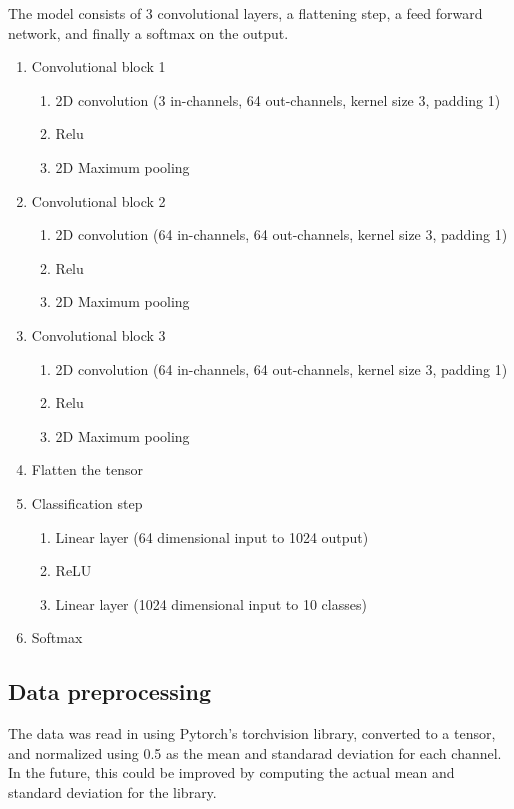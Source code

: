 \documentclass[letterpaper, 12pt]{article}
\begin{document}
The model consists of 3 convolutional layers, a flattening step, a feed forward network, and finally a softmax on the output.
\begin{enumerate}
\item Convolutional block 1
    \begin{enumerate}
    \item 2D convolution (3 in-channels, 64 out-channels, kernel size 3, padding 1)
    \item Relu
    \item 2D Maximum pooling
    \end{enumerate}
    
\item Convolutional block 2
    \begin{enumerate}
    \item 2D convolution (64 in-channels, 64 out-channels, kernel size 3, padding 1)
    \item Relu
    \item 2D Maximum pooling
    \end{enumerate}
    
\item Convolutional block 3
    \begin{enumerate}
    \item 2D convolution (64 in-channels, 64 out-channels, kernel size 3, padding 1)
    \item Relu
    \item 2D Maximum pooling
    \end{enumerate}
\item Flatten the tensor
\item Classification step
    \begin{enumerate}
     \item Linear layer (64 dimensional input to 1024 output)
     \item ReLU
     \item Linear layer (1024 dimensional input to 10 classes)
    \end{enumerate}
\item Softmax
\end{enumerate}

\subsection{Data preprocessing}
The data was read in using Pytorch's torchvision library, converted to a tensor, and normalized using 0.5 as the mean and standarad deviation for each channel. In the future, this could be improved by computing the actual mean and standard deviation for the library.
\end{document}
